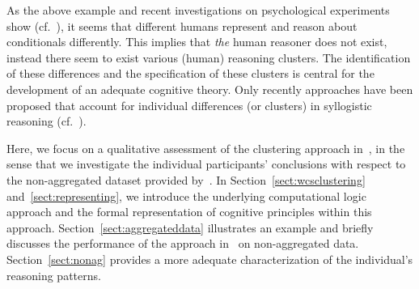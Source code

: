 \documentclass[12pt]{article}
\begin{document}
As the above example and recent investigations on psychological experiments show (cf.~\cite{khemlani:2016, ragni:2017}), it seems that different humans represent and reason about conditionals differently.
This implies that \textit{the} human reasoner does not exist, instead there 
seem to exist various (human) reasoning clusters. The identification of these differences and the specification of these clusters is central 
for the development of an adequate cognitive theory. Only recently approaches have been proposed that account for individual differences (or clusters) in syllogistic reasoning (cf.~\cite{khemlani:2016,declare:2017}). 



Here, we focus on a qualitative assessment of the clustering approach in~\cite{declare:2017},
in the sense that we investigate the individual participants' conclusions with respect to the non-aggregated dataset provided by~\cite{khemlani:2016}.
In Section~\ref{sect:wcsclustering} and~\ref{sect:representing}, we introduce the underlying computational logic approach and the formal representation of cognitive principles within this approach. Section~\ref{sect:aggregateddata} illustrates an example and briefly discusses the performance of the approach in~\cite{declare:2017} on non-aggregated data.
Section~\ref{sect:nonag} provides a more adequate characterization of the individual's reasoning patterns.
\end{document}
